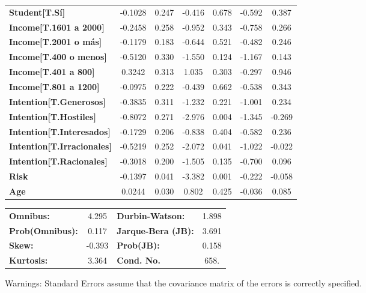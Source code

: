 \documentclass{report}
\begin{document}
\begin{center}
\begin{tabular}{lcccccc}
\textbf{Student[T.Sí]}             &      -0.1028  &        0.247     &    -0.416  &         0.678        &       -0.592    &        0.387     \\
\textbf{Income[T.1601 a 2000]}     &      -0.2458  &        0.258     &    -0.952  &         0.343        &       -0.758    &        0.266     \\
\textbf{Income[T.2001 o más]}      &      -0.1179  &        0.183     &    -0.644  &         0.521        &       -0.482    &        0.246     \\
\textbf{Income[T.400 o menos]}     &      -0.5120  &        0.330     &    -1.550  &         0.124        &       -1.167    &        0.143     \\
\textbf{Income[T.401 a 800]}       &       0.3242  &        0.313     &     1.035  &         0.303        &       -0.297    &        0.946     \\
\textbf{Income[T.801 a 1200]}      &      -0.0975  &        0.222     &    -0.439  &         0.662        &       -0.538    &        0.343     \\
\textbf{Intention[T.Generosos]}    &      -0.3835  &        0.311     &    -1.232  &         0.221        &       -1.001    &        0.234     \\
\textbf{Intention[T.Hostiles]}     &      -0.8072  &        0.271     &    -2.976  &         0.004        &       -1.345    &       -0.269     \\
\textbf{Intention[T.Interesados]}  &      -0.1729  &        0.206     &    -0.838  &         0.404        &       -0.582    &        0.236     \\
\textbf{Intention[T.Irracionales]} &      -0.5219  &        0.252     &    -2.072  &         0.041        &       -1.022    &       -0.022     \\
\textbf{Intention[T.Racionales]}   &      -0.3018  &        0.200     &    -1.505  &         0.135        &       -0.700    &        0.096     \\
\textbf{Risk}                      &      -0.1397  &        0.041     &    -3.382  &         0.001        &       -0.222    &       -0.058     \\
\textbf{Age}                       &       0.0244  &        0.030     &     0.802  &         0.425        &       -0.036    &        0.085     \\
\bottomrule
\end{tabular}
\begin{tabular}{lclc}
\textbf{Omnibus:}       &  4.295 & \textbf{  Durbin-Watson:     } &    1.898  \\
\textbf{Prob(Omnibus):} &  0.117 & \textbf{  Jarque-Bera (JB):  } &    3.691  \\
\textbf{Skew:}          & -0.393 & \textbf{  Prob(JB):          } &    0.158  \\
\textbf{Kurtosis:}      &  3.364 & \textbf{  Cond. No.          } &     658.  \\
\bottomrule
\end{tabular}
\end{center}

Warnings: \newline
 [1] Standard Errors assume that the covariance matrix of the errors is correctly specified.
\end{document}

